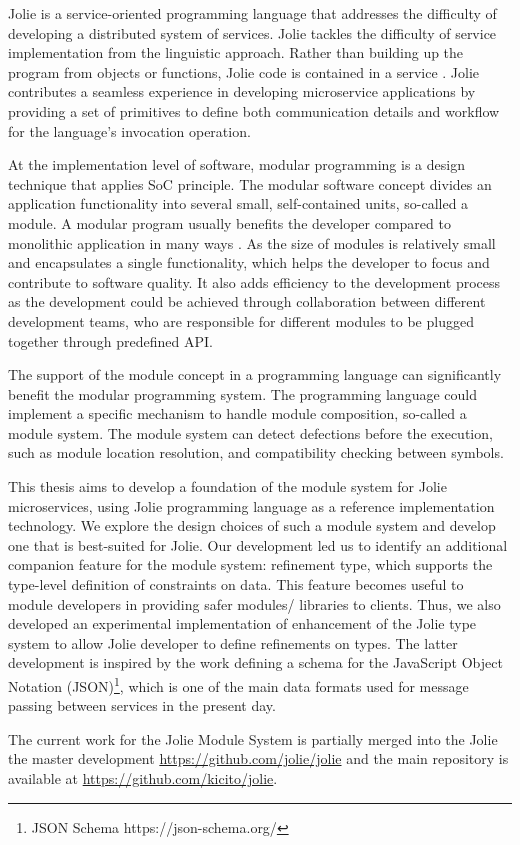 Jolie\cite{JOLIE} is a service-oriented programming language that addresses the difficulty of developing a distributed system of services. Jolie tackles the difficulty of service implementation from the linguistic approach. Rather than building up the program from objects or functions, Jolie code is contained in a service \cite{jolie-website}. Jolie contributes a seamless experience in developing microservice applications by providing a set of primitives to define both communication details and workflow for the language's invocation operation.

At the implementation level of software, modular programming is a design technique that applies SoC principle. The modular software concept divides an application functionality into several small, self-contained units, so-called a module. A modular program usually benefits the developer compared to monolithic application in many ways \cite{mall-2018}. As the size of modules is relatively small and encapsulates a single functionality, which helps the developer to focus and contribute to software quality. It also adds efficiency to the development process as the development could be achieved through collaboration between different development teams, who are responsible for different modules to be plugged together through predefined API.

The support of the module concept in a programming language can significantly benefit the modular programming system. The programming language could implement a specific mechanism to handle module composition, so-called a module system. The module system can detect defections before the execution, such as module location resolution, and compatibility checking between symbols.

This thesis aims to develop a foundation of the module system for Jolie microservices, using Jolie programming language as a reference implementation technology. We explore the design choices of such a module system and develop one that is best-suited for Jolie. Our development led us to identify an additional companion feature for the module system: refinement type, which supports the type-level definition of constraints on data. This feature becomes useful to module developers in providing safer modules/ libraries to clients. Thus, we also developed an experimental implementation of enhancement of the Jolie type system to allow Jolie developer to define refinements on types. The latter development is inspired by the work defining a schema for the JavaScript Object Notation (JSON)\footnote{JSON Schema https://json-schema.org/}, which is one of the main data formats used for message passing between services in the present day.

The current work for the Jolie Module System is partially merged into the Jolie the master development \url{https://github.com/jolie/jolie} and the main repository is available at \url{https://github.com/kicito/jolie}.
